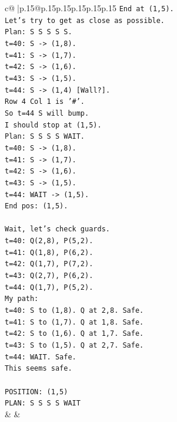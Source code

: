 \documentclass{article}
\begin{document}
{\begin{supertabular}{c@{$\;$}|p{.15\linewidth}@{}p{.15\linewidth}p{.15\linewidth}p{.15\linewidth}p{.15\linewidth}p{.15\linewidth}}
{{{\texttt{End at (1,5).} \\
\texttt{Let's try to get as close as possible.} \\
\texttt{Plan: S S S S S.} \\
\texttt{t=40: S {-}> (1,8).} \\
\texttt{t=41: S {-}> (1,7).} \\
\texttt{t=42: S {-}> (1,6).} \\
\texttt{t=43: S {-}> (1,5).} \\
\texttt{t=44: S {-}> (1,4) {[}Wall?{]}.} \\
\texttt{Row 4 Col 1 is '\#'.} \\
\texttt{So t=44 S will bump.} \\
\texttt{I should stop at (1,5).} \\
\texttt{Plan: S S S S WAIT.} \\
\texttt{t=40: S {-}> (1,8).} \\
\texttt{t=41: S {-}> (1,7).} \\
\texttt{t=42: S {-}> (1,6).} \\
\texttt{t=43: S {-}> (1,5).} \\
\texttt{t=44: WAIT {-}> (1,5).} \\
\texttt{End pos: (1,5).} \\
\\ 
\texttt{Wait, let's check guards.} \\
\texttt{t=40: Q(2,8), P(5,2).} \\
\texttt{t=41: Q(1,8), P(6,2).} \\
\texttt{t=42: Q(1,7), P(7,2).} \\
\texttt{t=43: Q(2,7), P(6,2).} \\
\texttt{t=44: Q(1,7), P(5,2).} \\
\texttt{My path:} \\
\texttt{t=40: S to (1,8). Q at 2,8. Safe.} \\
\texttt{t=41: S to (1,7). Q at 1,8. Safe.} \\
\texttt{t=42: S to (1,6). Q at 1,7. Safe.} \\
\texttt{t=43: S to (1,5). Q at 2,7. Safe.} \\
\texttt{t=44: WAIT. Safe.} \\
\texttt{This seems safe.} \\
\\ 
\texttt{POSITION: (1,5)} \\
\texttt{PLAN: S S S S WAIT} \\
            }
        }
    }
    & & \\ \\


\end{supertabular}}
\end{document}
